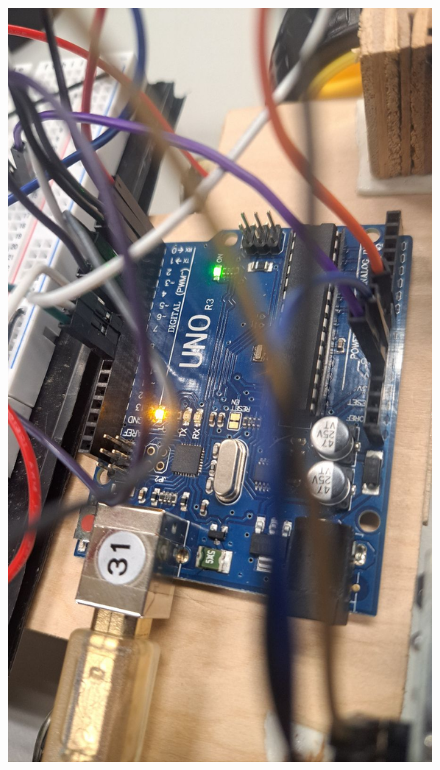 \documentclass[a4paper,12pt]{./article}
\begin{document}
\begin{center}\begin{figure}[H]\centering
\hfill
\begin{minipage}[t]{./0.45\textwidth}
\centering
\includegraphics[width=\textwidth]{./photos/g.jpg}
\end{minipage}
\hfill
\begin{minipage}[t]{./0.45\textwidth}
\centering

\end{minipage}
\end{figure}
\end{center}
\end{document}
